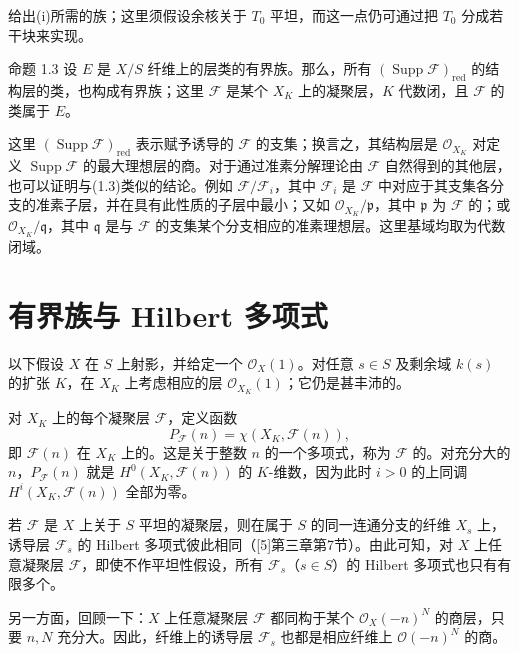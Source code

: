 给出(i)所需的族；这里须假设余核关于 $T_0$ 平坦，而这一点仍可通过把 $T_0$ 分成若干块来实现。

\begin{statement}{命题 1.3}
设 $E$ 是 $X/S$ 纤维上的层类的有界族。那么，所有 $(\operatorname{Supp}\mathcal F)_{\mathrm{red}}$ 的结构层的类，也构成有界族；这里 $\mathcal F$ 是某个 $X_K$ 上的凝聚层，$K$ 代数闭，且 $\mathcal F$ 的类属于 $E$。
\end{statement}
这里 $(\operatorname{Supp}\mathcal F)_{\mathrm{red}}$ 表示赋予诱导的 $\mathcal F$ 的支集；换言之，其结构层是 $\mathcal O_{X_K}$ 对定义 $\operatorname{Supp}\mathcal F$ 的最大理想层的商。对于通过准素分解理论由 $\mathcal F$ 自然得到的其他层，也可以证明与(1.3)类似的结论。例如 $\mathcal F/\mathcal F_i$，其中 $\mathcal F_i$ 是 $\mathcal F$ 中对应于其支集各分支的准素子层，并在具有此性质的子层中最小；又如 $\mathcal O_{X_K}/\mathfrak p$，其中 $\mathfrak p$ 为 $\mathcal F$ 的；或 $\mathcal O_{X_K}/\mathfrak q$，其中 $\mathfrak q$ 是与 $\mathcal F$ 的支集某个分支相应的准素理想层。这里基域均取为代数闭域。

\section{有界族与 Hilbert 多项式}
以下假设 $X$ 在 $S$ 上射影，并给定一个 $\mathcal O_X(1)$。对任意 $s\in S$ 及剩余域 $k(s)$ 的扩张 $K$，在 $X_K$ 上考虑相应的层 $\mathcal O_{X_K}(1)$；它仍是甚丰沛的。

对 $X_K$ 上的每个凝聚层 $\mathcal F$，定义函数
\[
P_{\mathcal F}(n)=\chi(X_K,\mathcal F(n)),
\]
即 $\mathcal F(n)$ 在 $X_K$ 上的。这是关于整数 $n$ 的一个多项式，称为 $\mathcal F$ 的。对充分大的 $n$，$P_{\mathcal F}(n)$ 就是 $H^0(X_K,\mathcal F(n))$ 的 $K$-维数，因为此时 $i>0$ 的上同调 $H^i(X_K,\mathcal F(n))$ 全部为零。

若 $\mathcal F$ 是 $X$ 上关于 $S$ 平坦的凝聚层，则在属于 $S$ 的同一连通分支的纤维 $X_s$ 上，诱导层 $\mathcal F_s$ 的 Hilbert 多项式彼此相同（[5]第三章第7节）。由此可知，对 $X$ 上任意凝聚层 $\mathcal F$，即使不作平坦性假设，所有 $\mathcal F_s$（$s\in S$）的 Hilbert 多项式也只有有限多个。

另一方面，回顾一下：$X$ 上任意凝聚层 $\mathcal F$ 都同构于某个 $\mathcal O_X(-n)^N$ 的商层，只要 $n,N$ 充分大。因此，纤维上的诱导层 $\mathcal F_s$ 也都是相应纤维上 $\mathcal O(-n)^N$ 的商。

